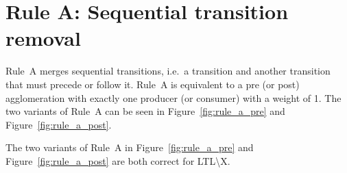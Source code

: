 \section*{Rule A: Sequential transition removal}\label{sec:rule_a}
Rule~A merges sequential transitions, i.e.\ a transition and another transition that must precede or follow it.
Rule~A is equivalent to a pre (or post) agglomeration with exactly one producer (or consumer) with a weight of 1.
The two variants of Rule~A can be seen in Figure~\ref{fig:rule_a_pre} and Figure~\ref{fig:rule_a_post}.

\begin{theorem}\label{theorem:rule_a}
    The two variants of Rule~A in Figure~\ref{fig:rule_a_pre} and Figure~\ref{fig:rule_a_post} are both correct for LTL\textbackslash X.
\end{theorem}

